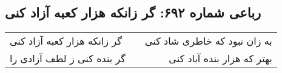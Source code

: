 \begin{center}
\section*{رباعی شماره ۶۹۲: گر زانکه هزار کعبه آزاد کنی}
\label{sec:sh692}
\begin{longtable}{l p{0.5cm} r}
گر زانکه هزار کعبه آزاد کنی
&&
به زان نبود که خاطری شاد کنی
\\
گر بنده کنی ز لطف آزادی را
&&
بهتر که هزار بنده آباد کنی
\\
\end{longtable}
\end{center}

